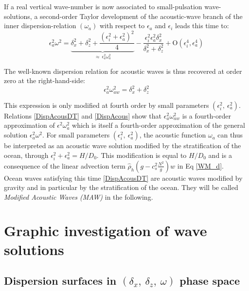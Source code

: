\documentclass[a4paper,11pt]{article}
\begin{document}
If a real vertical wave-number is now associated to small-pulsation wave-solutions, a second-order Taylor development of the acoustic-wave branch of the inner dispersion-relation $(\omega_a)$  with respect to $\epsilon_a$ and $\epsilon_i$ leads this time to:
\begin{equation}
		\epsilon_a^2\omega^2 =
		\underbrace{\delta_x^2+\delta_z^2
		+\frac{(\epsilon_i^2+\epsilon_a^2)^2}{4}}
		_{\approx\ \epsilon_a^2\omega_a^2}
		-\frac{\epsilon_i^2\epsilon_a^2\delta_x^2}{\delta_x^2+\delta_z^2}
		+\mathrm{O}(\epsilon_i^4,\epsilon_a^4)
		\label{DispAcousDT}
\end{equation}

The well-known dispersion relation for acoustic waves is thus recovered at order zero at the right-hand-side:
\begin{equation}
	\epsilon_a^2\omega_{aw}^2 =\delta_x^2+\delta_z^2
	\label{DispAcous}
\end{equation}

This expression is only modified at fourth order by small parameters $(\epsilon_i^2,\ \epsilon_a^2)$. Relations \ref{DispAcousDT} and \ref{DispAcous} show that $\epsilon_a^2 \omega_{aw}^2$ is a fourth-order approximation of $\epsilon^2 \omega_a^2$ which is itself a fourth-order approximation of the general solution $\epsilon_a^2 \omega^2$.
For small parameters $(\epsilon_i^2,\ \epsilon_a^2)$, the acoustic function $\omega_a$ can thus be interpreted as an acoustic wave solution modified by the stratification of the ocean, through $\epsilon_i^2+\epsilon_a^2=H/D_0$. This modification is equal to $H/D_0$ and is a consequence of the linear advection term $\hat{\rho}_h(g-c_s^2 \frac{N^2}{g})w$ in Eq \ref{WM_d}.\\
Ocean waves satisfying this time \ref{DispAcousDT} are acoustic waves modified by gravity and in particular by the stratification of the ocean. They will be called \textit{Modified Acoustic Waves (MAW)} in the following.

\newpage
\section{Graphic investigation of wave solutions}
\label{SectionGraphic}

\subsection{Dispersion surfaces in $(\delta_x,\ \delta_z,\ \omega)$ phase space}
\label{SubSectionDispSurfIntro}
\end{document}
